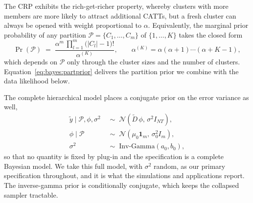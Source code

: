 \documentclass[margin=5in, 12pt]{article}
\newcommand{\1}{\mathbbm{1}}
\begin{document}
The CRP exhibits the rich-get-richer property, whereby clusters with more members are more likely to attract additional CATTs, but a fresh cluster can always be opened with weight proportional to $\alpha$. Equivalently, the marginal prior probability of any partition $\mathcal{P} = \{C_{1},\dots,C_{m}\}$ of $\{1,\dots,K\}$ takes the closed form
  \begin{equation}
    \Pr(\mathcal{P}) \;=\; \frac{\alpha^{m}\,\prod_{l=1}^{m}\bigl(|C_{l}| - 1\bigr)!}{\alpha^{(K)}}, \qquad \alpha^{(K)} =
  \alpha(\alpha+1)\cdots(\alpha+K-1),
    \label{eq:bayes:partprior}
  \end{equation}
  which depends on $\mathcal{P}$ only through the cluster sizes and the number of clusters. Equation~\eqref{eq:bayes:partprior}
  delivers the partition prior we combine with the data likelihood below.


The complete hierarchical model places a conjugate prior on the error variance as well,
  \begin{align}
    \tilde{y} \mid \mathcal{P}, \phi, \sigma^{2} &\;\sim\; \mathcal{N}\!\left(\tilde{D}\,\phi,\,\sigma^{2} I_{NT}\right),
  \label{eq:bayes:cond}\\
    \phi \mid \mathcal{P} &\;\sim\; \mathcal{N}\!\left(\mu_{0}\mathbf{1}_{m},\,\sigma_{0}^{2} I_{m}\right), \label{eq:bayes:phi}\\
    \sigma^{2} &\;\sim\; \mathrm{Inv\text{-}Gamma}(a_{0}, b_{0}), \label{eq:bayes:sigma}
  \end{align}
  so that no quantity is fixed by plug-in and the specification is a complete Bayesian model. We take this full model, with $\sigma^{2}$ random, as our primary specification throughout, and it is what the simulations and applications report. The inverse-gamma prior is conditionally conjugate, which keeps the collapsed sampler tractable.
\end{document}
